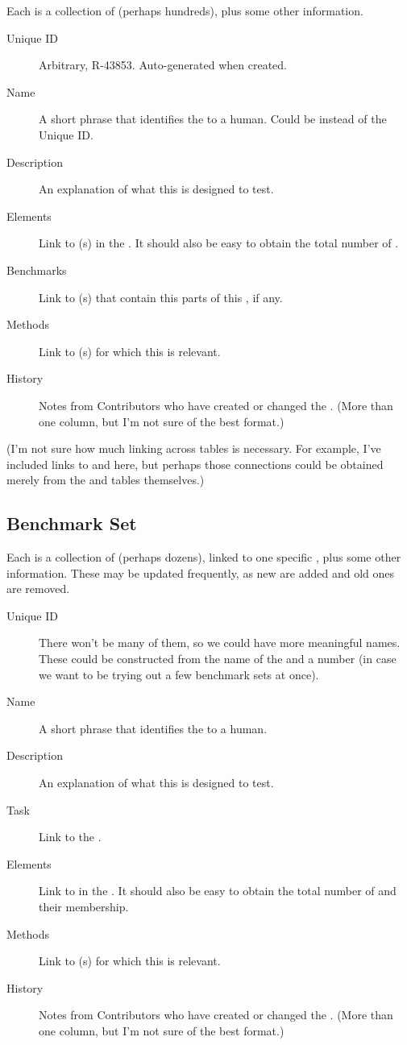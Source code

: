 Each \Refset is a collection of \Elements (perhaps hundreds), plus some other information.

\begin{description}
    \item[Unique ID] Arbitrary, \eg R-43853.  Auto-generated when created.
    \item[Name] A short phrase that identifies the \Refset to a human.  Could be instead of the Unique ID.
    \item[Description] An explanation of what this \Refset is designed to test.
    \item[Elements] Link to \Element(s) in the \Refset.  It should also be easy to obtain the total number of \Elements.
    \item[Benchmarks] Link to \Benchmark(s) that contain this parts of this \Refset, if any.
    \item[Methods] Link to \Method(s) for which this \Refset is relevant.
    \item[History] Notes from Contributors who have created or changed the \Refset.  (More than one column, but I'm not sure of the best format.)
\end{description}

(I'm not sure how much linking across tables is necessary.
For example, I've included links to \Benchmark and \Method here, but perhaps those connections could be obtained merely from the \Benchmark and \Method tables themselves.)

\subsection{Benchmark Set}
\label{sec:tables_benchmarks}

Each \Benchmark is a collection of \Elements (perhaps dozens), linked to one specific \Task, plus some other information.
These may be updated frequently, as new \Elements are added and old ones are removed.

\begin{description}
    \item[Unique ID] There won't be many of them, so we could have more meaningful names.  These could be constructed from the name of the \Task and a number (in case we want to be trying out a few benchmark sets at once).
    \item[Name] A short phrase that identifies the \Benchmark to a human.
    \item[Description] An explanation of what this \Benchmark is designed to test.
    \item[Task] Link to the \Task.
    \item[Elements] Link to \Element in the \Benchmark.  It should also be easy to obtain the total number of \Elements and their \Refset membership.
    \item[Methods] Link to \Method(s) for which this \Benchmark is relevant.
    \item[History] Notes from Contributors who have created or changed the \Benchmark.  (More than one column, but I'm not sure of the best format.)
\end{description}

